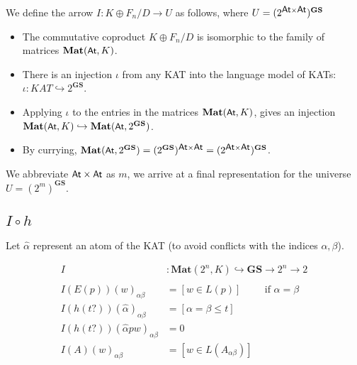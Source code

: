 \documentclass{article}
\newcommand{\atoms}{\textsf{\small{At}}}
\newcommand{\actions}{\Sigma}
\newcommand{\mat}[1]{\textbf{Mat}(#1)}
\newcommand{\gs}{\textbf{GS}}
\newcommand{\universe}{(2^{m})^\gs}
\newcommand{\coproduct}{K \oplus F_n / D}
\begin{document}
We define the arrow $I : \coproduct \rightarrow U$ as follows, where $U = (2^{\atoms \times \atoms})^\gs$
\begin{itemize}
\item The commutative coproduct $\coproduct$ is isomorphic to the family of matrices $\mat{\atoms,K}$.
\item There is an injection $\iota$ from any KAT into the language model of KATs: $\iota : KAT \hookrightarrow 2^\gs$.
\item Applying $\iota$ to the entries in the matrices $\mat{\atoms,K}$, gives an injection $\mat{\atoms,K} \hookrightarrow \mat{\atoms,2^\gs}$.
\item By currying, $\mat{\atoms,2^\gs} = (2^{\gs})^{\atoms \times \atoms} = (2^{\atoms \times \atoms})^\gs$.
\end{itemize}

We abbreviate $\atoms \times \atoms$ as $m$, we arrive at a final representation for the universe $U = \universe$.

\subsection*{$I \circ h$}

Let $\hat{\alpha}$ represent an atom of the KAT (to avoid conflicts with the indices $\alpha, \beta$).

\begin{align*}
  I &: \mat{2^n,K} \hookrightarrow \gs \rightarrow 2^n \rightarrow 2
\\
\\I(E(p))(w)_{\alpha\beta} &= [ w \in L(p) ] \hspace{1cm} \mbox{if $\alpha = \beta$}
\\I(h(t?))(\hat{\alpha})_{\alpha\beta} &= [ \alpha = \beta \le t ]
\\I(h(t?))(\hat{\alpha}pw)_{\alpha\beta} &= 0
\\I(A)(w)_{\alpha\beta} &= [ w \in L(A_{\alpha\beta}) ]
\end{align*}


\end{document}
